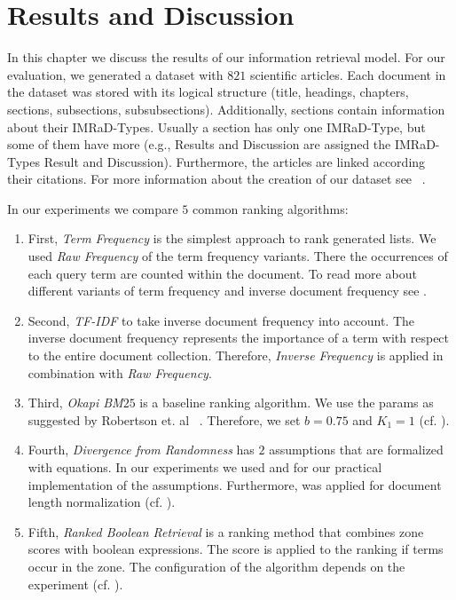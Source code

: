 \chapter{Results and Discussion}
\label{cha:results_discussion}

In this chapter we discuss the results of our information retrieval model. For our evaluation, we generated a dataset with $821$ scientific articles. Each document in the dataset was stored with its logical structure (title, headings, chapters, sections, subsections, subsubsections). Additionally, sections contain information about their IMRaD-Types. Usually a section has only one IMRaD-Type, but some of them have more (e.g., Results and Discussion are assigned the IMRaD-Types Result and Discussion). Furthermore, the articles are linked according their citations. For more information about the creation of our dataset see ~.

In our experiments we compare $5$ common ranking algorithms:
\begin{enumerate}
  \item First, \textit{Term Frequency} is the simplest approach to rank generated lists. We used \textit{Raw Frequency} of the term frequency variants. There the occurrences of each query term are counted within the document. To read more about different variants of term frequency and inverse document frequency see .
  \item Second, \textit{TF-IDF} to take inverse document frequency into account. The inverse document frequency represents the importance of a term with respect to the entire document collection. Therefore, \textit{Inverse Frequency} is applied in combination with \textit{Raw Frequency}.
  \item Third, \textit{Okapi BM$25$} is a baseline ranking algorithm. We use the params as suggested by Robertson et. al ~\cite{RobertsonWJHG94}. Therefore, we set $b=0.75$ and $K_1 = 1$ (cf. ).
  \item Fourth, \textit{Divergence from Randomness} has $2$ assumptions that are formalized with equations. In our experiments we used  and  for our practical implementation of the assumptions. Furthermore,  was applied for document length normalization (cf. ). 
  \item Fifth, \textit{Ranked Boolean Retrieval} is a ranking method that combines zone scores with boolean expressions. The score is applied to the ranking if terms occur in the zone. The configuration of the algorithm depends on the experiment (cf. ).
\end{enumerate}


